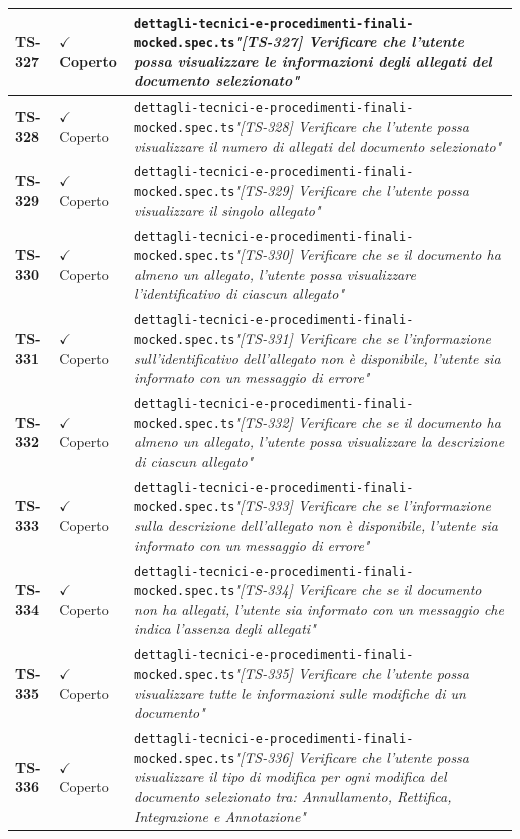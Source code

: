 \documentclass[a4paper,12pt]{article}
\newcommand{\ok}{\textcolor{green!60!black}{$\checkmark$ Coperto}}
\newcommand{\f}[1]{\nolinkurl{#1}\newline}
\newcommand{\q}[1]{\textit{#1}}
\begin{document}
\begin{longtable}{|p{1.5cm}|p{3.0cm}|p{10.5cm}|}
\textbf{TS-327} & \ok & \f{dettagli-tecnici-e-procedimenti-finali-mocked.spec.ts}\q{"[TS-327] Verificare che l'utente possa visualizzare le informazioni degli allegati del documento selezionato"} \\ \hline
\textbf{TS-328} & \ok & \f{dettagli-tecnici-e-procedimenti-finali-mocked.spec.ts}\q{"[TS-328] Verificare che l'utente possa visualizzare il numero di allegati del documento selezionato"} \\ \hline
\textbf{TS-329} & \ok & \f{dettagli-tecnici-e-procedimenti-finali-mocked.spec.ts}\q{"[TS-329] Verificare che l'utente possa visualizzare il singolo allegato"} \\ \hline
\textbf{TS-330} & \ok & \f{dettagli-tecnici-e-procedimenti-finali-mocked.spec.ts}\q{"[TS-330] Verificare che se il documento ha almeno un allegato, l'utente possa visualizzare l'identificativo di ciascun allegato"} \\ \hline
\textbf{TS-331} & \ok & \f{dettagli-tecnici-e-procedimenti-finali-mocked.spec.ts}\q{"[TS-331] Verificare che se l'informazione sull'identificativo dell'allegato non è disponibile, l'utente sia informato con un messaggio di errore"} \\ \hline
\textbf{TS-332} & \ok & \f{dettagli-tecnici-e-procedimenti-finali-mocked.spec.ts}\q{"[TS-332] Verificare che se il documento ha almeno un allegato, l'utente possa visualizzare la descrizione di ciascun allegato"} \\ \hline
\textbf{TS-333} & \ok & \f{dettagli-tecnici-e-procedimenti-finali-mocked.spec.ts}\q{"[TS-333] Verificare che se l'informazione sulla descrizione dell'allegato non è disponibile, l'utente sia informato con un messaggio di errore"} \\ \hline
\textbf{TS-334} & \ok & \f{dettagli-tecnici-e-procedimenti-finali-mocked.spec.ts}\q{"[TS-334] Verificare che se il documento non ha allegati, l'utente sia informato con un messaggio che indica l'assenza degli allegati"} \\ \hline
\textbf{TS-335} & \ok & \f{dettagli-tecnici-e-procedimenti-finali-mocked.spec.ts}\q{"[TS-335] Verificare che l'utente possa visualizzare tutte le informazioni sulle modifiche di un documento"} \\ \hline
\textbf{TS-336} & \ok & \f{dettagli-tecnici-e-procedimenti-finali-mocked.spec.ts}\q{"[TS-336] Verificare che l'utente possa visualizzare il tipo di modifica per ogni modifica del documento selezionato tra: Annullamento, Rettifica, Integrazione e Annotazione"} \\ \hline

\end{longtable}
\end{document}
